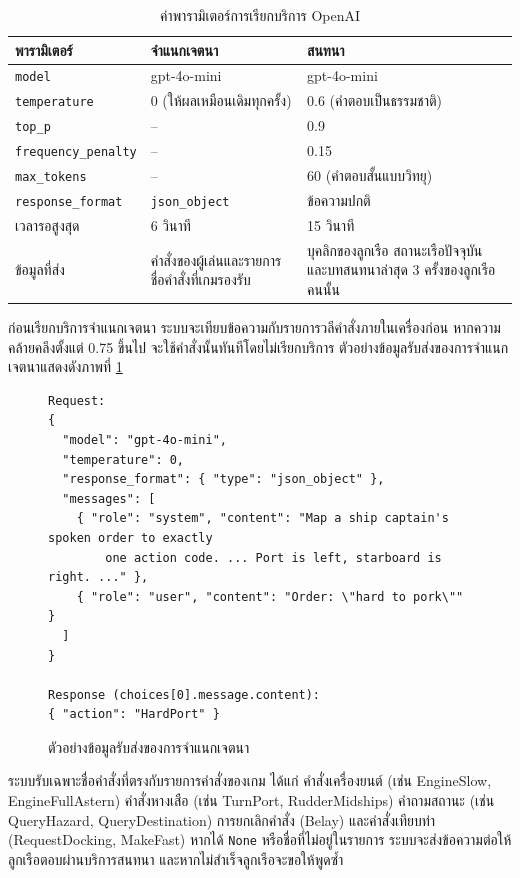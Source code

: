 \begin{table}[!htbp]
\centering
\caption{ค่าพารามิเตอร์การเรียกบริการ OpenAI}
\label{tab:openai_params}
\begin{tabular}{|L{3.49cm}|L{4.56cm}|L{5.23cm}|}
\hline
\textbf{พารามิเตอร์} & \textbf{จำแนกเจตนา} & \textbf{สนทนา} \\
\hline
\texttt{model} & gpt-4o-mini & gpt-4o-mini \\ \hline
\texttt{temperature} & 0 (ให้ผลเหมือนเดิมทุกครั้ง) & 0.6 (คำตอบเป็นธรรมชาติ) \\ \hline
\texttt{top\_\allowbreak p} & -- & 0.9 \\ \hline
\texttt{frequency\_\allowbreak penalty} & -- & 0.15 \\ \hline
\texttt{max\_\allowbreak tokens} & -- & 60 (คำตอบสั้นแบบวิทยุ) \\ \hline
\texttt{response\_\allowbreak format} & \texttt{json\_\allowbreak object} & ข้อความปกติ \\ \hline
เวลารอสูงสุด & 6 วินาที & 15 วินาที \\ \hline
ข้อมูลที่ส่ง & คำสั่งของผู้เล่นและรายการชื่อคำสั่งที่เกมรองรับ & บุคลิกของลูกเรือ สถานะเรือปัจจุบัน และบทสนทนาล่าสุด 3 ครั้งของลูกเรือคนนั้น \\
\hline
\end{tabular}
\end{table}

ก่อนเรียกบริการจำแนกเจตนา ระบบจะเทียบข้อความกับรายการวลีคำสั่งภายในเครื่องก่อน หากความคล้ายคลึงตั้งแต่ 0.75 ขึ้นไป จะใช้คำสั่งนั้นทันทีโดยไม่เรียกบริการ ตัวอย่างข้อมูลรับส่งของการจำแนกเจตนาแสดงดังภาพที่ \ref{lst:intent_json}

\begin{figure}[!htbp]
\centering
\begin{lstlisting}[basicstyle=\ttfamily\footnotesize,numbers=none]
Request:
{
  "model": "gpt-4o-mini",
  "temperature": 0,
  "response_format": { "type": "json_object" },
  "messages": [
    { "role": "system", "content": "Map a ship captain's spoken order to exactly
        one action code. ... Port is left, starboard is right. ..." },
    { "role": "user", "content": "Order: \"hard to pork\"" }
  ]
}

Response (choices[0].message.content):
{ "action": "HardPort" }
\end{lstlisting}
\caption{ตัวอย่างข้อมูลรับส่งของการจำแนกเจตนา}
\label{lst:intent_json}
\end{figure}

ระบบรับเฉพาะชื่อคำสั่งที่ตรงกับรายการคำสั่งของเกม ได้แก่ คำสั่งเครื่องยนต์ (เช่น EngineSlow, EngineFullAstern) คำสั่งหางเสือ (เช่น TurnPort, RudderMidships) คำถามสถานะ (เช่น QueryHazard, QueryDestination) การยกเลิกคำสั่ง (Belay) และคำสั่งเทียบท่า (RequestDocking, MakeFast) หากได้ \texttt{None} หรือชื่อที่ไม่อยู่ในรายการ ระบบจะส่งข้อความต่อให้ลูกเรือตอบผ่านบริการสนทนา และหากไม่สำเร็จลูกเรือจะขอให้พูดซ้ำ

